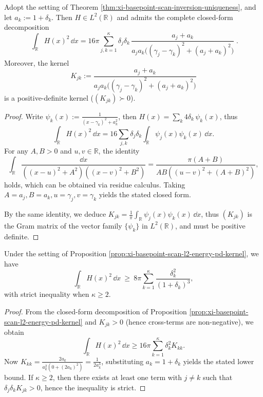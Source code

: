 \begin{proposition}\label{prop:xi-basepoint-scan-l2-energy-pd-kernel}
Adopt the setting of Theorem \ref{thm:xi-basepoint-scan-inversion-uniqueness}, and let \(a_k:=1+\delta_k\).
Then \(H\in L^{2}(\mathbb{R})\) and admits the complete closed-form decomposition
\[
\boxed{\;
\int_{\mathbb{R}}H(x)^{2}\,\dd x
=16\pi\sum_{j,k=1}^{\kappa}\delta_j\delta_k\,
\frac{a_j+a_k}{a_ja_k\bigl((\gamma_j-\gamma_k)^{2}+(a_j+a_k)^{2}\bigr)}\; }.
\]
Moreover, the kernel
\[
K_{jk}:=\frac{a_j+a_k}{a_ja_k\bigl((\gamma_j-\gamma_k)^{2}+(a_j+a_k)^{2}\bigr)}
\]
is a positive-definite kernel (\((K_{jk})\succ 0\)).
\end{proposition}
\begin{proof}
Write \(\psi_k(x):=\frac{1}{(x-\gamma_k)^2+a_k^2}\), then \(H(x)=\sum_k 4\delta_k\,\psi_k(x)\), thus
\[
\int_{\mathbb{R}}H(x)^2\,\dd x
=16\sum_{j,k}\delta_j\delta_k\int_{\mathbb{R}}\psi_j(x)\psi_k(x)\,\dd x.
\]
For any \(A,B>0\) and \(u,v\in\mathbb{R}\), the identity
\[
\int_{\mathbb{R}}\frac{\dd x}{((x-u)^{2}+A^{2})((x-v)^{2}+B^{2})}
=\frac{\pi(A+B)}{AB((u-v)^{2}+(A+B)^{2})},
\]
holds, which can be obtained via residue calculus. Taking \(A=a_j,B=a_k,u=\gamma_j,v=\gamma_k\) yields the stated closed form.
\par
By the same identity, we deduce
\(
K_{jk}=\frac{1}{\pi}\int_{\mathbb{R}}\psi_j(x)\psi_k(x)\,\dd x
\),
thus \((K_{jk})\) is the Gram matrix of the vector family \(\{\psi_k\}\) in \(L^2(\mathbb{R})\), and must be positive definite.
\end{proof}

\begin{corollary}\label{cor:xi-basepoint-scan-l2-energy-diagonal-lower-bound}
Under the setting of Proposition \ref{prop:xi-basepoint-scan-l2-energy-pd-kernel}, we have
\[
\int_{\mathbb{R}}H(x)^{2}\,\dd x
\ \ge\ 8\pi\sum_{k=1}^{\kappa}\frac{\delta_k^{2}}{(1+\delta_k)^{3}},
\]
with strict inequality when \(\kappa\ge 2\).
\end{corollary}
\begin{proof}
From the closed-form decomposition of Proposition \ref{prop:xi-basepoint-scan-l2-energy-pd-kernel} and \(K_{jk}>0\) (hence cross-terms are non-negative), we obtain
\[
\int_{\mathbb{R}}H(x)^{2}\,\dd x\ge 16\pi\sum_{k=1}^{\kappa}\delta_k^2 K_{kk}.
\]
Now
\(
K_{kk}=\frac{2a_k}{a_k^2(0+(2a_k)^2)}=\frac{1}{2a_k^3}
\), substituting \(a_k=1+\delta_k\) yields the stated lower bound.
If \(\kappa\ge 2\), then there exists at least one term with \(j\neq k\) such that \(\delta_j\delta_k K_{jk}>0\), hence the inequality is strict.
\end{proof}

